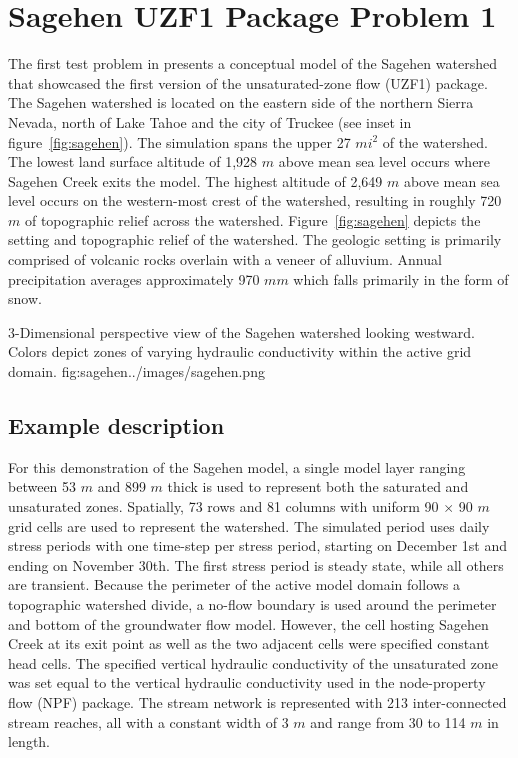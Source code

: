 \section{Sagehen UZF1 Package Problem 1}

The first test problem in \cite{UZF} presents a conceptual model of the Sagehen watershed that showcased the first version of the unsaturated-zone flow (UZF1) package. The Sagehen watershed is located on the eastern side of the northern Sierra Nevada, north of Lake Tahoe and the city of Truckee (see inset in figure~\ref{fig:sagehen}). The simulation spans the upper 27 $mi^2$ of the watershed.  The lowest land surface altitude of 1,928 $m$ above mean sea level occurs where Sagehen Creek exits the model.  The highest altitude of 2,649 $m$ above mean sea level occurs on the western-most crest of the watershed, resulting in roughly 720 $m$ of topographic relief across the watershed.  Figure~\ref{fig:sagehen} depicts the setting and topographic relief of the watershed. The geologic setting is primarily comprised of volcanic rocks overlain with a veneer of alluvium. Annual precipitation averages approximately 970 $mm$ which falls primarily in the form of snow.  

\begin{StandardFigure}
	{3-Dimensional perspective view of the Sagehen watershed looking westward.  Colors depict zones of varying hydraulic conductivity within the active grid domain.}
	{fig:sagehen}{../images/sagehen.png}
\end{StandardFigure}

\subsection{Example description}

For this \mf demonstration of the Sagehen model, a single model layer ranging between 53 $m$ and 899 $m$ thick is used to represent both the saturated and unsaturated zones.  Spatially, 73 rows and 81 columns with uniform 90 $\times$ 90 $m$ grid cells are used to represent the watershed.  The simulated period uses daily stress periods with one time-step per stress period, starting on December 1st and ending on November 30th.  The first stress period is steady state, while all others are transient.  Because the perimeter of the active model domain follows a topographic watershed divide, a no-flow boundary is used around the perimeter and bottom of the groundwater flow model.  However, the cell hosting Sagehen Creek at its exit point as well as the two adjacent cells were specified constant head cells.  The specified vertical hydraulic conductivity of the unsaturated zone was set equal to the vertical hydraulic conductivity used in the node-property flow (NPF) package. The stream network is represented with 213 inter-connected stream reaches, all with a constant width of 3 $m$ and range from 30 to 114 $m$ in length.  

